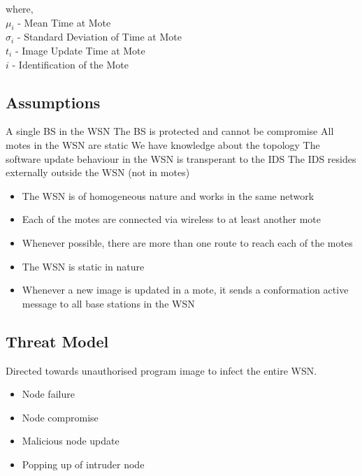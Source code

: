\documentclass[conference,man]{IEEEtran}
\begin{document}
where, \\
\hspace {2cm} $\mu_i$ - Mean Time at Mote  \\
\hspace {2cm} $\sigma_i$ - Standard Deviation of  Time at Mote  \\
\hspace {2cm} $t_i$ - Image Update Time at Mote  \\
\hspace {2cm} $i$ - Identification of the Mote  \\


\subsection{Assumptions}

A single BS in the WSN
The BS is protected and cannot be compromise
All motes in the WSN are static
We have knowledge about the topology
The software update behaviour in the WSN is transperant to the IDS
The IDS resides externally outside the WSN (not in motes)


\begin{itemize}
	\item	The WSN is of homogeneous nature and works in the same network
	\item	Each of the motes are  connected via wireless to at least another mote
	\item	Whenever possible, there are more than one route to reach each of the motes
	\item	The WSN is static in nature
	\item	Whenever a new image is updated in a mote, it sends a conformation active message to all base stations in the WSN
\end{itemize}

\subsection{Threat Model}


Directed towards unauthorised program image to infect the entire WSN.
\begin{itemize}
\item Node failure
\item Node compromise
\item Malicious node update
\item Popping up of intruder node
\end{itemize}
\end{document}
